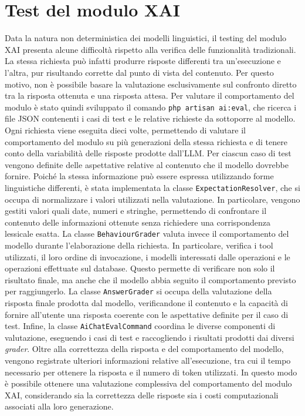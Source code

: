\section{Test del modulo XAI}
Data la natura non deterministica dei modelli linguistici, il testing del modulo XAI presenta alcune difficoltà rispetto alla verifica delle funzionalità tradizionali. La stessa 
richiesta può infatti produrre risposte differenti tra un'esecuzione e l'altra, pur risultando corrette dal punto di vista del contenuto. Per questo motivo, non è possibile 
basare la valutazione esclusivamente sul confronto diretto tra la risposta ottenuta e una risposta attesa.
\newline
Per valutare il comportamento del modulo è stato quindi sviluppato il comando \texttt{php artisan ai:eval}, che ricerca i file JSON contenenti i casi di test e le relative 
richieste da sottoporre al modello. Ogni richiesta viene eseguita dieci volte, permettendo di valutare il comportamento del modulo su più generazioni della stessa richiesta e 
di tenere conto della variabilità delle risposte prodotte dall'LLM.
\newline
Per ciascun caso di test vengono definite delle aspettative relative al contenuto che il modello dovrebbe fornire. Poiché la stessa informazione può essere espressa utilizzando 
forme linguistiche differenti, è stata implementata la classe \texttt{ExpectationResolver}, che si occupa di normalizzare i valori utilizzati nella valutazione. In particolare, 
vengono gestiti valori quali date, numeri e stringhe, permettendo di confrontare il contenuto delle informazioni ottenute senza richiedere una corrispondenza lessicale esatta.
\newline
La classe \texttt{BehaviourGrader} valuta invece il comportamento del modello durante l'elaborazione della richiesta. In particolare, verifica i tool utilizzati, il loro ordine 
di invocazione, i modelli interessati dalle operazioni e le operazioni effettuate sul database. Questo permette di verificare non solo il risultato finale, ma anche che il 
modello abbia seguito il comportamento previsto per raggiungerlo.
\newline
La classe \texttt{AnswerGrader} si occupa della valutazione della risposta finale prodotta dal modello, verificandone il contenuto e la capacità di fornire all'utente una 
risposta coerente con le aspettative definite per il caso di test.
\newline
Infine, la classe \texttt{AiChatEvalCommand} coordina le diverse componenti di valutazione, eseguendo i casi di test e raccogliendo i risultati prodotti dai diversi 
\textit{grader}. Oltre alla correttezza della risposta e del comportamento del modello, vengono registrate ulteriori informazioni relative all'esecuzione, tra cui il tempo 
necessario per ottenere la risposta e il numero di token utilizzati. In questo modo è possibile ottenere una valutazione complessiva del comportamento del modulo XAI, 
considerando sia la correttezza delle risposte sia i costi computazionali associati alla loro generazione.


